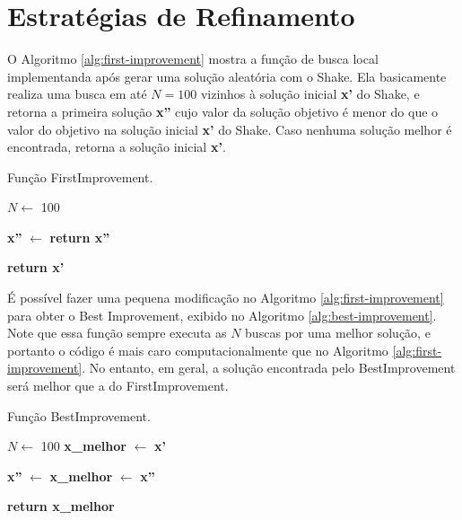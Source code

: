 \documentclass[
	12pt,				%
	oneside,			%
	a4paper,			%
	chapter=TITLE,
	sumario=tradicional,
	english,			%
	brazil				%
]{abntex2}
\begin{document}
\section{Estratégias de Refinamento}

O Algoritmo \ref{alg:first-improvement} mostra a função de busca local
implementanda após gerar uma solução aleatória com o Shake. Ela basicamente 
realiza uma busca em até $N = 100$ vizinhos à solução inicial \textbf{x'} do Shake, 
e retorna a primeira 
solução \textbf{x''} cujo valor da solução objetivo é menor do que o valor do objetivo na 
solução inicial \textbf{x'} do Shake. Caso nenhuma solução melhor é encontrada, 
retorna a solução inicial \textbf{x'}.

\begin{algorithm}[H]
	\caption{Função FirstImprovement.}\label{alg:first-improvement}

	\begin{algorithmic}[1]

	\State $N\gets$ 100 

		\State \textbf{x''} $\gets$  
			\State \textbf{return x''} 
		\EndIf
	\EndFor
		
	\Statex
	\State \textbf{return x'} 
	\EndProcedure 
	\end{algorithmic}
\end{algorithm}

É possível fazer uma pequena modificação no Algoritmo \ref{alg:first-improvement} 
para obter o Best Improvement, exibido no Algoritmo \ref{alg:best-improvement}. 
Note que essa função sempre executa as $N$ buscas por uma melhor solução, e 
portanto o código é mais caro computacionalmente que no Algoritmo \ref{alg:first-improvement}.
No entanto, em geral, a solução encontrada pelo BestImprovement será melhor que a 
do FirstImprovement.

\begin{algorithm}[H]
	\caption{Função BestImprovement.}\label{alg:best-improvement}

	\begin{algorithmic}[1]

	\State $N\gets$ 100 
	\State \textbf{x\_melhor} $\gets$ \textbf{x'}

		\State \textbf{x''} $\gets$  
			\State \textbf{x\_melhor} $\gets$ \textbf{x''}
		\EndIf
	\EndFor
		
	\Statex
	\State \textbf{return x\_melhor} 
	\EndProcedure 
	\end{algorithmic}
\end{algorithm}
\end{document}
